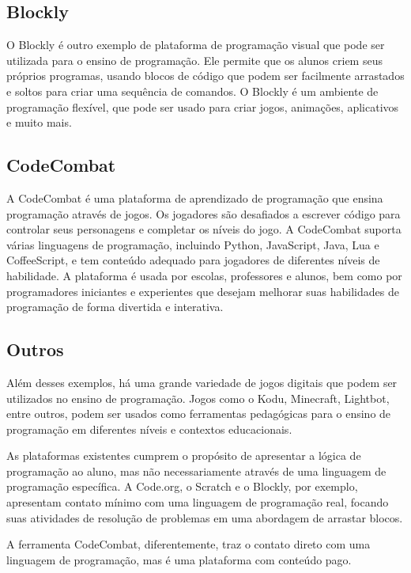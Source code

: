 \subsection{Blockly}

O Blockly é outro exemplo de plataforma de programação visual que pode ser utilizada para o ensino de programação. Ele permite que os alunos criem seus próprios programas, usando blocos de código que podem ser facilmente arrastados e soltos para criar uma sequência de comandos. O Blockly é um ambiente de programação flexível, que pode ser usado para criar jogos, animações, aplicativos e muito mais.

\subsection{CodeCombat}
A CodeCombat é uma plataforma de aprendizado de programação que ensina programação através de jogos. Os jogadores são desafiados a escrever código para controlar seus personagens e completar os níveis do jogo. A CodeCombat suporta várias linguagens de programação, incluindo Python, JavaScript, Java, Lua e CoffeeScript, e tem conteúdo adequado para jogadores de diferentes níveis de habilidade. A plataforma é usada por escolas, professores e alunos, bem como por programadores iniciantes e experientes que desejam melhorar suas habilidades de programação de forma divertida e interativa.

\subsection{Outros}
Além desses exemplos, há uma grande variedade de jogos digitais que podem ser utilizados no ensino de programação. Jogos como o Kodu, Minecraft, Lightbot, entre outros, podem ser usados como ferramentas pedagógicas para o ensino de programação em diferentes níveis e contextos educacionais.

As plataformas existentes cumprem o propósito de apresentar a lógica de programação ao aluno, mas não necessariamente através de uma linguagem de programação específica. A Code.org, o Scratch e o Blockly, por exemplo, apresentam contato mínimo com uma linguagem de programação real, focando suas atividades de resolução de problemas  em uma abordagem de arrastar blocos.

A ferramenta CodeCombat, diferentemente, traz o contato direto com uma linguagem de programação, mas é uma plataforma com conteúdo pago.